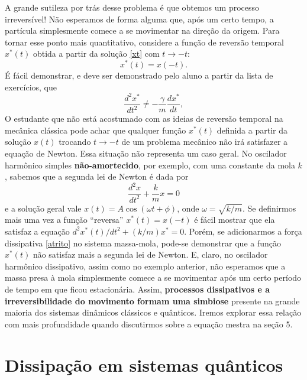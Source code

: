 \documentclass{article}
\begin{document}
A grande sutileza por trás desse problema é que obtemos um processo irreversível! Não esperamos de forma alguma que, após um certo tempo, a partícula simplesmente comece a se movimentar na direção da origem. Para tornar esse ponto mais quantitativo, considere a função de reversão temporal $x^* (t)$ obtida a partir da solução \eqref{xt} com $t\rightarrow -t$:
\begin{equation}
    x^* (t) = x(-t).
\end{equation}
É fácil demonstrar, e deve ser demonstrado pelo aluno a partir da lista de exercícios, que
\begin{equation}
    \frac{d^2 x^*}{dt^2} \neq -\frac{\gamma}{m}\frac{dx^*}{dt},
\end{equation}
O estudante que não está acostumado com as ideias de reversão temporal na mecânica clássica pode achar que qualquer função $x^* (t)$ definida a partir da solução $x(t)$ trocando $t\rightarrow -t$ de um problema mecânico não irá satisfazer a equação de Newton. Essa situação não representa um caso geral. No oscilador harmônico simples \textbf{não-amortecido}, por exemplo, com uma constante da mola $k$, sabemos que a segunda lei de Newton é dada por
\begin{equation}
    \frac{d^2 x}{dt^2 } + \frac{k}{m}x = 0
\end{equation}
e a solução geral vale $x(t) = A\cos(\omega t + \phi)$, onde $\omega = \sqrt{k/m}$. Se definirmos mais uma vez a função ``reversa'' $x^* (t) = x(-t)$ é fácil mostrar que ela satisfaz a equação $d^2 x^* (t) / dt^2 + (k/m)x^* = 0$. Porém, se adicionarmos a força dissipativa \eqref{atrito} no sistema massa-mola, pode-se demonstrar que a função $x^* (t)$ não satisfaz mais a segunda lei de Newton. E, claro, no oscilador harmônico dissipativo, assim como no exemplo anterior, não esperamos que a massa presa à mola simplesmente comece a se movimentar após um certo período de tempo em que ficou estacionária. Assim, \textbf{processos dissipativos e a irreversibilidade do movimento formam uma simbiose} presente na grande maioria dos sistemas dinâmicos clássicos e quânticos. Iremos explorar essa relação com mais profundidade quando discutirmos sobre a equação mestra na seção 5.



\section{Dissipação em sistemas quânticos}
\end{document}
